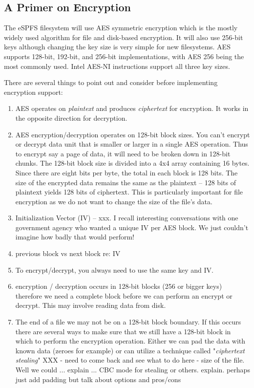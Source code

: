 
\subsection{A Primer on Encryption}

The eSPFS filesystem will use AES symmetric encryption which is the mostly widely used algorithm for file and disk-based encryption. It will also use 256-bit keys although changing the key size is very simple for new filesystems. AES supports 128-bit, 192-bit, and 256-bit implementations, with AES 256 being the most commonly used. Intel AES-NI instructions support all three key sizes.

There are several things to point out and consider before implementing encryption support:

\begin{enumerate}
	\item AES operates on \textit{plaintext} and produces \textit{ciphertext} for encryption. It works in the opposite direction
		for decryption.
	\item AES encryption/decryption operates on 128-bit block sizes. You can't encrypt or decrypt data unit that is smaller or
		larger in a single AES operation. Thus to encrypt say a page of data, it will need to be broken down in 128-bit
		chunks. The 128-bit block size is divided into a 4x4 array containing 16 bytes. Since there are eight bits per byte, 
		the total in each block is 128 bits. The size of the encrypted data remains the same as the plaintext -- 128 bits of 
		plaintext yields 128 bits of ciphertext. This is particularly important for file encryption as we do not want to change
		the size of the file's data.
	\item Initialization Vector (IV) -- xxx. I recall interesting conversations with one government agency who wanted a unique
		IV per AES block. We just couldn't imagine how badly that would perform! 
	\item previous block vs next block re: IV
	\item To encrypt/decrypt, you always need to use the same key and IV.
	\item encryption / decryption occurs in 128-bit blocks (256 or bigger keys) therefore we need a complete block before
		we can perform an encrypt or decrypt. This may involve reading data from disk.
	\item The end of a file we may not be on a 128-bit block boundary. If this occurs there are several ways to make sure
		that we still have a 128-bit block in which to perform the encryption operation. Either we can pad the data with known
		data (zeroes for example) or can utilize a technique called "\textit{ciphertext stealing}" XXX - need to come back 
		and see what to do here - %
		size of the file. Well we could ... explain ... CBC mode for stealing or others. explain. perhaps just add padding
		but talk about options and pros/cons
\end{enumerate}

